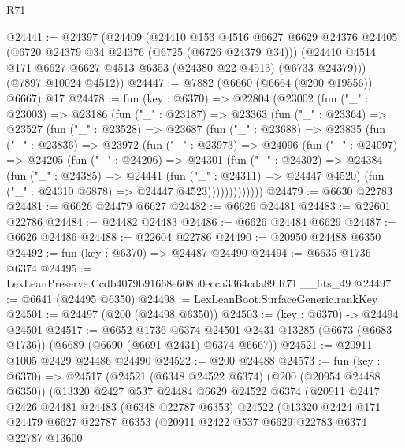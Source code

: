 \begin{lexlean}{R71}
\begin{coremodule}
@24441 := @24397
    (@24409
      (@24410
        @153
        @4516
        @6627
        @6629
        @24376
        @24405
        (@6720 @24379 @34 @24376 (@6725 (@6726 @24379 @34)))
        (@24410 @4514 @171 @6627 @6627 @4513 @6353 (@24380 @22 @4513) (@6733 @24379)))
      (@7897 @10024 @4512))
@24447 := @7882 (@6660 (@6664 (@200 @19556)) @6667) @17
@24478 := fun (key : @6370) =>
  @22804
    (@23002
      (fun ("_" : @23003) =>
      @23186
        (fun ("_" : @23187) =>
        @23363
          (fun ("_" : @23364) =>
          @23527
            (fun ("_" : @23528) =>
            @23687
              (fun ("_" : @23688) =>
              @23835
                (fun ("_" : @23836) =>
                @23972
                  (fun ("_" : @23973) =>
                  @24096
                    (fun ("_" : @24097) =>
                    @24205
                      (fun ("_" : @24206) =>
                      @24301
                        (fun ("_" : @24302) =>
                        @24384
                          (fun ("_" : @24385) =>
                          @24441
                            (fun ("_" : @24311) => @24447 @4520)
                            (fun ("_" : @24310 @6878) => @24447 @4523)))))))))))))
@24479 := @6630 @22783
@24481 := @6626 @24479 @6627
@24482 := @6626 @24481
@24483 := @22601 @22786
@24484 := @24482 @24483
@24486 := @6626 @24484 @6629
@24487 := @6626 @24486
@24488 := @22604 @22786
@24490 := @20950 @24488 @6350
@24492 := fun (key : @6370) => @24487 @24490
@24494 := @6635 @1736 @6374
@24495 := LexLeanPreserve.Ccdb4079b91668e608b0ecca3364cda89.R71.__fits_49
@24497 := @6641 (@24495 @6350)
@24498 := LexLeanBoot.SurfaceGeneric.rankKey
@24501 := @24497 (@200 (@24498 @6350))
@24503 := (key : @6370) -> @24494 @24501
@24517 := @6652
    @1736
    @6374
    @24501
    @2431
    @13285
    (@6673 (@6683 @1736))
    (@6689 (@6690 (@6691 @2431) @6374 @6667))
@24521 := @20911 @1005 @2429 @24486 @24490
@24522 := @200 @24488
@24573 := fun (key : @6370) =>
  @24517
    (@24521
      (@6348 @24522 @6374)
      (@200 (@20954 @24488 @6350))
      (@13320
        @2427
        @537
        @24484
        @6629
        @24522
        @6374
        (@20911
          @2417
          @2426
          @24481
          @24483
          (@6348 @22787 @6353)
          @24522
          (@13320
            @2424
            @171
            @24479
            @6627
            @22787
            @6353
            (@20911
              @2422
              @537
              @6629
              @22783
              @6374
              @22787
              @13600

\end{coremodule}
\end{lexlean}
